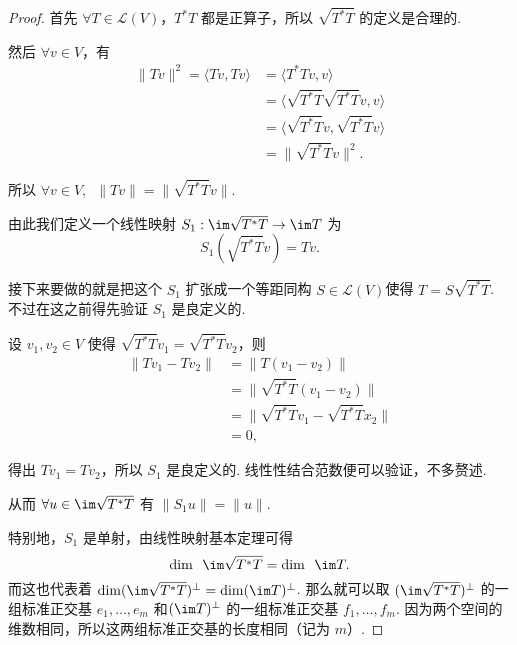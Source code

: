 \begin{proof}
    首先 $ \forall T \in \mathcal{L}(V) $，$ T^{*}T $ 都是正算子，所以 $ \sqrt{T^*T} $ 的定义是合理的.

    然后 $ \forall v \in V $，有
    \begin{align*}
        \lVert Tv \rVert^2 = \langle Tv, Tv \rangle & = \langle T^*Tv, v \rangle                   \\
                                                    & = \langle \sqrt{T^*T}\sqrt{T^*T}v, v \rangle \\
                                                    & = \langle \sqrt{T^*T}v, \sqrt{T^*T}v \rangle \\
                                                    & = \lVert \sqrt{T^*T}v \rVert^2.
    \end{align*}

    所以 $ \forall v \in V ,\enspace \lVert Tv \rVert = \lVert \sqrt{T^*T}v \rVert $.

    由此我们定义一个线性映射 $ S_1: \im \sqrt{T^*T} \rightarrow \im T $ 为
    \[ S_1(\sqrt{T^*T}v) = Tv. \]

    接下来要做的就是把这个 $ S_1 $ 扩张成一个等距同构 $ S \in \mathcal{L}(V) $使得 $ T = S\sqrt{T^*T} $. 不过在这之前得先验证 $ S_1 $ 是良定义的.

    设 $ v_1, v_2 \in V $ 使得 $ \sqrt{T^*T}v_1 = \sqrt{T^*T}v_2 $，则
    \begin{align*}
        \lVert Tv_1 - Tv_2 \rVert & = \lVert T(v_1 - v_2) \rVert                    \\
                                  & = \lVert \sqrt{T^*T}(v_1 - v_2)\rVert           \\
                                  & = \lVert \sqrt{T^*T}v_1 - \sqrt{T^*T}x_2 \rVert \\
                                  & = 0,
    \end{align*}

    得出 $ Tv_1 = Tv_2 $，所以 $ S_1 $ 是良定义的. 线性性结合范数便可以验证，不多赘述.

    从而 $ \forall u \in \im \sqrt{T^*T} $ 有 $ \lVert S_1u \rVert = \lVert u \rVert $.

    特别地，$ S_1 $ 是单射，由线性映射基本定理可得
    \[ \dim \enspace \im \sqrt{T^*T} = \dim \enspace \im T. \]
    而这也代表着 $ \dim(\im \sqrt{T^*T})^{\perp} = \dim(\im T)^{\perp} $. 那么就可以取 $ (\im \sqrt{T^*T})^{\perp} $ 的一组标准正交基 $ e_1, \ldots , e_m $ 和$ (\im T)^{\perp} $ 的一组标准正交基 $ f_1, \ldots, f_m $. 因为两个空间的维数相同，所以这两组标准正交基的长度相同（记为 $ m $）.


\end{proof}

